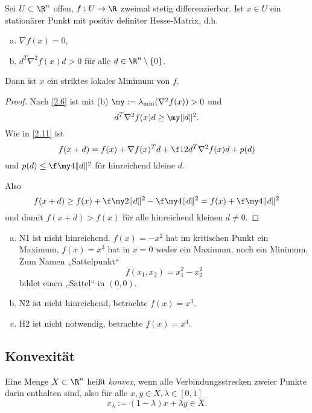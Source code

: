 \begin{st}
	Sei $U \subset \R^n$ offen, $f: U \to \R$ zweimal stetig differenzierbar.
	Ist $x \in U$ ein stationärer Punkt mit positiv definiter Hesse-Matrix, d.h.
	\begin{enumerate}[(a)]
		\item
			$\nabla f(x) = 0$,
		\item
			$d^T \nabla^2 f(x) d > 0$ für alle $d \in \R^n \setminus \{0\}$.
	\end{enumerate}
	Dann ist $x$ ein striktes lokales Minimum von $f$.
	\begin{proof}
		Nach \ref{2.6} ist mit (b) $\my := \lambda_{\text{min}} (\nabla^2 f(x)) > 0$ und
		\[
			d^T \nabla^2 f(x) d \ge \my \|d\|^2.
		\]
		Wie in \ref{2.11} ist
		\[
			f(x+d)
			= f(x) + \nabla f(x)^T d + \f 12 d^T \nabla^2 f(x) d + p(d)
		\]
		und $p(d) \le \f \my4 \|d\|^2$ für hinreichend kleine $d$.

		Also
		\[
			f(x+d)
			\ge f(x) + \f \my2 \|d\|^2 - \f \my4 \|d\|^2
			= f(x) + \f \my4 \|d\|^2
		\]
		und damit $f(x+d) > f(x)$ für alle hinreichend kleinen $d \neq 0$.
	\end{proof}
\end{st}

\begin{ex} \label{2.13}
	\begin{enumerate}[(a)]
		\item
			N1 ist nicht hinreichend.
			$f(x) = -x^2$ hat im kritischen Punkt ein Maximum,
			$f(x) = x^3$ hat in $x=0$ weder ein Maximum, noch ein Minimum.
			Zum Namen „Sattelpunkt“
			\[
				f(x_1,x_2) = x_1^2 - x_2^2
			\]
			bildet einen „Sattel“ in $(0,0)$.
		\item
			N2 ist nicht hinreichend, betrachte $f(x) = x^3$.
		\item
			H2 ist nicht notwendig, betrachte $f(x) = x^4$.
	\end{enumerate}
\end{ex}


\subsection{Konvexität}


\begin{df} \label{2.14}
	Eine Menge $X \subset \R^n$ heißt \emph{konvex}, wenn alle Verbindungsstrecken zweier Punkte darin enthalten sind, also für alle $x,y \in X, \lambda \in [0,1]$
	\[
		x_\lambda
		:= (1-\lambda)x + \lambda y \in X.
	\]
\end{df}

